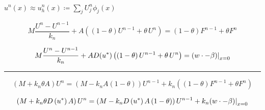 \documentclass[a4paper]{article}
\begin{document}
\begin{landscape}
\begin{flushleft}
        \medskip
        $u^n(x) \approx u^n_h(x) \coloneqq \sum_j U^n_j \phi_j(x)$
    \end{flushleft}

    \begin{minipage}{0.480\columnwidth}
        \begin{equation}
            M\frac{U^n - U^{n-1}}{k_n} + A \left(\left(1-\theta\right)U^{n-1} + \theta\, U^n\right) =  \left( 1-\theta \right) F^{n-1} + \theta F^n 
        \end{equation}
    \end{minipage}
    \hfill
    \begin{minipage}{0.4800\columnwidth}
        \begin{equation}
            M\frac{U^n - U^{n-1}}{k_n} + A D(u^*) \left(\left(1-\theta\right)U^{n-1} + \theta\, U^n\right) =  (w\cdot-\beta){\Huge\mid}_{x=0}
        \end{equation} 
    \end{minipage}

    \bigskip
    \noindent\rule{\columnwidth}{1pt}

    \begin{minipage}{0.48\columnwidth}
        \begin{equation}
            \left(M + k_n \theta A\right) U^n = \left(M - k_n A \left(1-\theta\right)\right) U^{n-1} + k_n\left(\left( 1-\theta \right) F^{n-1} + \theta F^n\right)
        \end{equation}
    \end{minipage}
    \hfill
    \begin{minipage}{0.51\columnwidth}
        \begin{equation}
            \left(M + k_n \theta D\left(u^\ast\right) A \right) U^n = \left(M - k_n D\left(u^\ast\right) A \left(1-\theta\right)\right) U^{n-1} + k_n(w\cdot-\beta){\Huge\mid}_{x=0}
        \end{equation} 
    \end{minipage}

\end{landscape}
\end{document}
